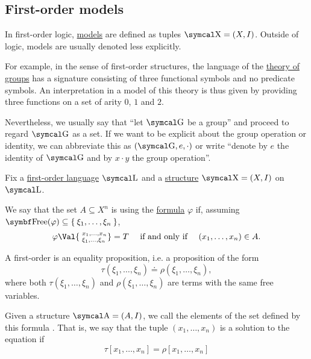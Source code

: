 \subsection{First-order models}\label{subsec:first_order_logic}

\begin{remark}\label{rem:first_order_model_notation}
  In first-order logic, \hyperref[def:first_order_semantics/satisfiability]{models} are defined as tuples \( \CX = (X, I) \). Outside of logic, models are usually denoted less explicitly.

  For example, in the sense of first-order structures, the language of the \hyperref[def:group/theory]{theory of groups} has a signature consisting of three functional symbols and no predicate symbols. An interpretation in a model of this theory is thus given by providing three functions on a set of arity \( 0 \), \( 1 \) and \( 2 \).

  Nevertheless, we usually say that \enquote{let \( \CG \) be a group} and proceed to regard \( \CG \) as a set. If we want to be explicit about the group operation or identity, we can abbreviate this as \( (\CG, e, \cdot) \) or write \enquote{denote by \( e \) the identity of \( \CG \) and by \( x \cdot y \) the group operation}.
\end{remark}

\begin{definition}\label{def:first_order_definability}
  Fix a \hyperref[def:first_order_language]{first-order language} \( \CL \) and a \hyperref[def:first_order_structure]{structure} \( \CX = (X, I) \) on \( \CL \).

  We say that the set \( A \subseteq X^n \) is  using the \hyperref[def:first_order_language]{formula} \( \varphi \) if, assuming \( {\Bold{Free}(\varphi) \subseteq \Set{ \xi_1, \ldots, \xi_n }} \),
  \begin{equation*}
    \varphi\Val{\phantom{.}_{\xi_1,\ldots,\xi_n}^{x_1,\ldots,x_n}} = T \quad\T{if and only if}\quad (x_1, \ldots, x_n) \in A.
  \end{equation*}
\end{definition}

\begin{definition}\label{def:first_order_equation}
  A first-order  is an equality proposition, i.e. a proposition of the form
  \begin{equation*}
    \tau(\xi_1, \ldots, \xi_n) \doteq \rho(\xi_1, \ldots, \xi_n),
  \end{equation*}
  where both \( \tau(\xi_1, \ldots, \xi_n) \) and \( \rho(\xi_1, \ldots, \xi_n) \) are terms with the same free variables.

  Given a structure \( \CA = (A, I) \), we call the elements of the set defined by this formula . That is, we say that the tuple \( (x_1, \ldots, x_n) \) is a solution to the equation if
  \begin{equation*}
    \tau[x_1, \ldots, x_n] = \rho[x_1, \ldots, x_n]
  \end{equation*}
\end{definition}


